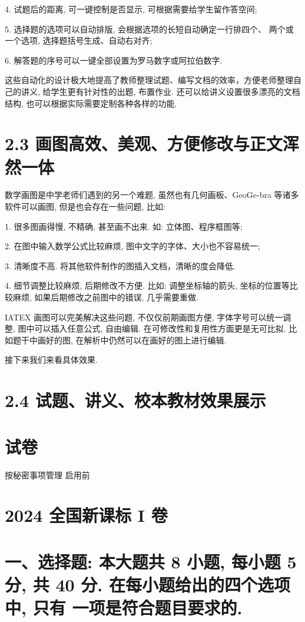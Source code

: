 \documentclass[10pt]{article}
\begin{document}
4. 试题后的距离, 可一键控制是否显示, 可根据需要给学生留作答空间;

5. 选择题的选项可以自动排版, 会根据选项的长短自动确定一行排四个、 两个或一个选项, 选择题括号生成、自动右对齐;

6. 解答题的序号可以一键全部设置为罗马数字或阿拉伯数字.

这些自动化的设计极大地提高了教师整理试题、编写文档的效率，方便老师整理自己的讲义, 给学生更有针对性的出题, 布置作业. 还可以给讲义设置很多漂亮的文档结构, 也可以根据实际需要定制各种各样的功能.

\section*{2.3 画图高效、美观、方便修改与正文浑然一体}

数学画图是中学老师们遇到的另一个难题, 虽然也有几何画板、GeoGe-bra 等诸多软件可以画图, 但是也会存在一些问题, 比如:

1. 很多图画得慢, 不精确, 甚至画不出来. 如: 立体图、程序框图等;

2. 在图中输入数学公式比较麻烦, 图中文字的字体、大小也不容易统一;

3. 清晰度不高. 将其他软件制作的图插入文档，清晰的度会降低.

4. 细节调整比较麻烦, 后期修改不方便. 比如: 调整坐标轴的箭头, 坐标的位置等比较麻烦, 如果后期修改之前图中的错误, 几乎需要重做.

IATEX 画图可以完美解决这些问题, 不仅仅前期画图方便, 字体字号可以统一调整, 图中可以插入任意公式, 自由编辑. 在可修改性和复用性方面更是无可比拟. 比如题干中画好的图, 在解析中仍然可以在画好的图上进行编辑.

接下来我们来看具体效果.

\section*{2.4 试题、讲义、校本教材效果展示}

\section*{试卷}

按秘密事项管理  启用前

\section*{2024 全国新课标 I 卷}

\section*{一、选择题: 本大题共 8 小题, 每小题 5 分, 共 40 分. 在每小题给出的四个选项中, 只有 一项是符合题目要求的.}
\end{document}
